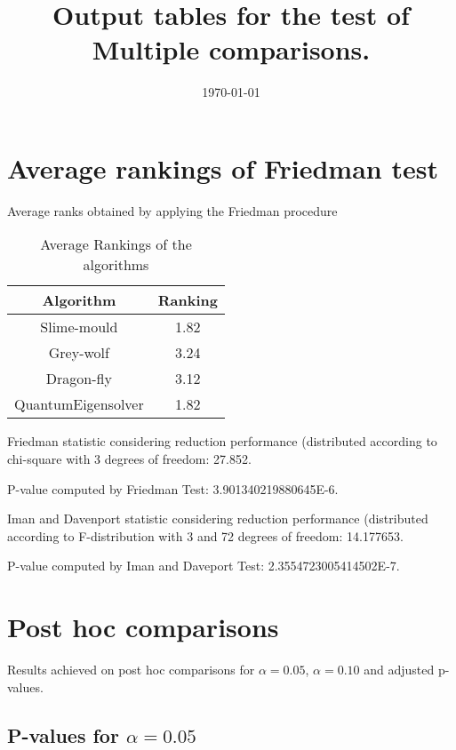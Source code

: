 \documentclass[a4paper,10pt]{article}
\title{Output tables for the test of Multiple comparisons.}
\author{}
\date{\today}
\begin{document}
\begin{landscape}
\pagestyle{empty}
\maketitle
\thispagestyle{empty}
\section{Average rankings of Friedman test}



Average ranks obtained by applying the Friedman procedure

\begin{table}[!htp]
\centering
\begin{tabular}{|c|c|}\hline
Algorithm&Ranking\\\hline
Slime-mould & 1.82\\
Grey-wolf & 3.24\\
Dragon-fly & 3.12\\
QuantumEigensolver & 1.82\\
\hline
\end{tabular}
\caption{Average Rankings of the algorithms}
\end{table}

Friedman statistic considering reduction performance (distributed according to chi-square with 3 degrees of freedom: 27.852.

P-value computed by Friedman Test: 3.901340219880645E-6.\newline

Iman and Davenport statistic considering reduction performance (distributed according to F-distribution with 3 and 72 degrees of freedom: 14.177653.

P-value computed by Iman and Daveport Test: 2.3554723005414502E-7.\newline



\pagebreak

\section{Post hoc comparisons}

Results achieved on post hoc comparisons for $\alpha = 0.05$, $\alpha = 0.10$ and adjusted p-values.

\subsection{P-values for $\alpha=0.05$}


\end{landscape}
\end{document}
